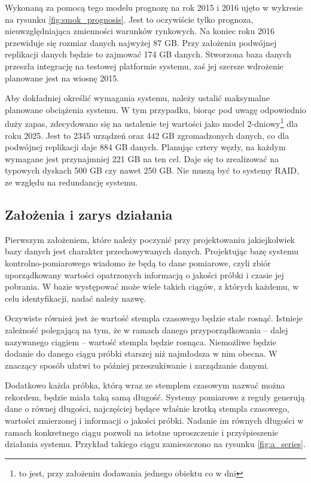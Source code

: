 \documentclass[a4paper,polish,12pt,twoside]{article}
\begin{document}
Wykonaną za pomocą tego modelu prognozę na rok 2015 i 2016 ujęto w wykresie na rysunku \ref{fig:smok_prognosis}. Jest to oczywiście tylko prognoza, nieuwzględniająca zmienności warunków rynkowych. Na koniec roku 2016 przewiduje się rozmiar danych najwyżej 87 GB. Przy założeniu podwójnej replikacji danych będzie to zajmować 174 GB danych. Stworzona baza danych przeszła integrację na testowej platformie systemu, zaś jej szersze wdrożenie planowane jest na wiosnę 2015.
 
Aby dokładniej określić wymagania systemu, należy ustalić maksymalne planowane obciążenia systemu. W tym przypadku, biorąc pod uwagę odpowiednio duży zapas, zdecydowano się na ustalenie tej wartości jako model 2-dniowy\footnote{to jest, przy założeniu dodawania jednego obiektu co w dni} dla roku 2025. Jest to 2345 urządzeń oraz 442 GB zgromadzonych danych, co dla podwójnej replikacji daje 884 GB danych. Planując cztery węzły, na każdym wymagane jest przynajmniej 221 GB na ten cel. Daje się to zrealizować na typowych dyskach 500 GB czy nawet 250 GB. Nie muszą być to systemy RAID, ze względu na redundancję systemu.

\subsection{Założenia i zarys działania}
		\label{sec:assumptions}
Pierwszym założeniem, które należy poczynić przy projektowaniu jakiejkolwiek bazy danych jest charakter przechowywanych danych. Projektując bazę systemu kontrolno-pomiarowego wiadomo że będą to dane pomiarowe, czyli zbiór uporządkowany wartości opatrzonych informacją o jakości próbki i czasie jej pobrania. W bazie występować może wiele takich ciągów, z których każdemu, w celu identyfikacji, nadać należy nazwę.

Oczywiste również jest że wartość stempla czasowego będzie stale rosnąć. Istnieje zależność polegającą na tym, że w ramach danego przyporządkowania – dalej nazywanego ciągiem – wartość stempla będzie rosnąca. Niemożliwe będzie dodanie do danego ciągu próbki starszej niż najmłodsza w nim obecna. W znaczący sposób ułatwi to później przeszukiwanie i zarządzanie danymi.

Dodatkowo każda próbka, którą wraz ze stemplem czasowym nazwać można rekordem, będzie miała taką samą długość. Systemy pomiarowe z reguły generują dane o równej długości, najczęściej będące właśnie krotką stempla czasowego, wartości zmierzonej i informacji o jakości próbki. Nadanie im równych długości w ramach konkretnego ciągu pozwoli na istotne uproszczenie i przyśpieszenie działania systemu. Przykład takiego ciągu zamieszczono na rysunku \ref{fig:a_series}.
\end{document}
